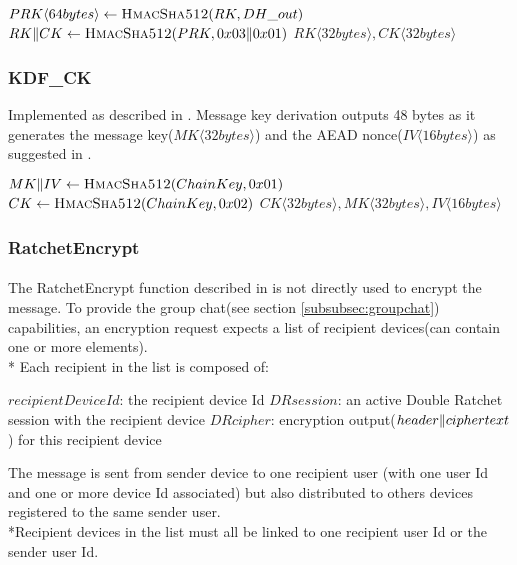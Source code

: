 \documentclass[a4paper,11pt]{article}
\begin{document}
      \begin{algorithmic}
          \State $PRK\langle 64bytes\rangle  \gets \Call{HmacSha512}{RK, DH\_out}$
          \State $RK\Arrowvert CK \gets \Call{HmacSha512}{PRK, 0x03\Arrowvert 0x01}$
          \State \Return $RK\langle 32bytes\rangle , CK\langle 32bytes\rangle$
        \EndFunction
      \end{algorithmic}
    \subsubsection{KDF\_CK}
      \label{subsubsec:kdfck}
      Implemented as described in \cite[section 5.2]{doubleRatchet}. Message key derivation outputs 48 bytes as it generates the message key($MK\langle 32bytes\rangle$) and the AEAD nonce($IV\langle 16 bytes\rangle$) as suggested in \cite[section 3.1 - ENCRYPT]{doubleRatchet}.
      \begin{algorithmic}
          \State $MK\Arrowvert IV \gets \Call{HmacSha512}{ChainKey, 0x01}$
          \State $CK \gets \Call{HmacSha512}{ChainKey, 0x02}$
          \State \Return $CK\langle 32bytes\rangle ,MK\langle 32bytes\rangle ,IV\langle 16 bytes\rangle $
        \EndFunction
      \end{algorithmic}

    \subsubsection{RatchetEncrypt}
      \paragraph{}The RatchetEncrypt function described in \cite[section 3.4]{doubleRatchet} is not directly used to encrypt the message. To provide the group chat(see section \ref{subsubsec:groupchat}) capabilities, an encryption request expects a list of recipient devices(can contain one or more elements).\\*
      Each recipient in the list is composed of:
        \begin{algorithmic}
          \State $recipientDeviceId$: the recipient device Id
          \State $DRsession$: an active Double Ratchet session with the recipient device
          \State $DRcipher$: encryption output($header\Arrowvert ciphertext$) for this recipient device
        \end{algorithmic}
      The message is sent from sender device to one recipient user (with one user Id and one or more device Id associated) but also distributed to others devices registered to the same sender user.
      \\*Recipient devices in the list must all be linked to one recipient user Id or the sender user Id.
      
\end{document}
